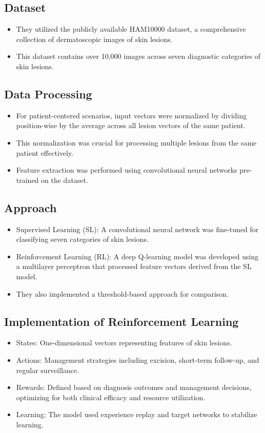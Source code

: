 \subsection*{Dataset}
\begin{itemize}
    \item They utilized the publicly available HAM10000 dataset, a comprehensive collection of dermatoscopic images of skin lesions.
    \item This dataset contains over 10,000 images across seven diagnostic categories of skin lesions.
\end{itemize}

\subsection*{Data Processing}
\begin{itemize}
    \item For patient-centered scenarios, input vectors were normalized by dividing position-wise by the average across all lesion vectors of the same patient.
    \item This normalization was crucial for processing multiple lesions from the same patient effectively.
    \item Feature extraction was performed using convolutional neural networks pre-trained on the dataset.
\end{itemize}

\subsection*{Approach}
\begin{itemize}
    \item Supervised Learning (SL): A convolutional neural network was fine-tuned for classifying seven categories of skin lesions.
    \item Reinforcement Learning (RL): A deep Q-learning model was developed using a multilayer perceptron that processed feature vectors derived from the SL model.
    \item They also implemented a threshold-based approach for comparison.
\end{itemize}

\subsection*{Implementation of Reinforcement Learning}
\begin{itemize}
    \item States: One-dimensional vectors representing features of skin lesions.
    \item Actions: Management strategies including excision, short-term follow-up, and regular surveillance.
    \item Rewards: Defined based on diagnosis outcomes and management decisions, optimizing for both clinical efficacy and resource utilization.
    \item Learning: The model used experience replay and target networks to stabilize learning.
\end{itemize}

